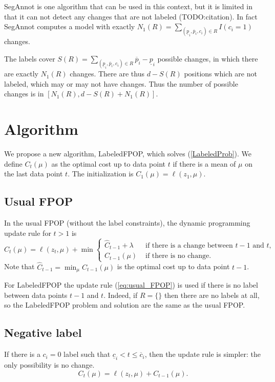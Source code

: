 \documentclass{article}
\begin{document}
SegAnnot is one algorithm that can be used in this context, but it is
limited in that it can not detect any changes that are not labeled
(TODO:citation). In fact SegAnnot computes a model with exactly
$N_1(R)=\sum_{(\underline p_i, \overline p_i, c_i)\in R} I(c_i=1)$ changes.

The labels cover
$S(R)=\sum_{(\underline p_i, \overline p_i, c_i)\in R} \overline
p_i-\underline p_i$ possible changes, in which there are exactly
$N_1(R)$ changes. There are thus $d-S(R)$ positions which are not
labeled, which may or may not have changes. Thus the number of
possible changes is in $[N_1(R), d-S(R)+N_1(R)]$.

\section{Algorithm}

We propose a new algorithm, LabeledFPOP, which solves
(\ref{LabeledProb}). We define $C_t(\mu)$ as the optimal cost up to
data point $t$ if there is a mean of $\mu$ on the last data point
$t$. The initialization is $C_1(\mu)= \ell(z_1, \mu)$. 

\subsection{Usual FPOP}
In the usual
FPOP (without the label constraints), the dynamic programming update
rule for $t>1$ is
\begin{equation}
  \label{eq:usual_FPOP}
  C_t(\mu)=\ell(z_t, \mu) + \min
  \begin{cases}
\hat C_{t-1}+\lambda &\text{ if there is a change between $t-1$ and $t$,}\\
C_{t-1}(\mu) & \text{ if there is no change.}
  \end{cases}
\end{equation}
Note that $\hat C_{t-1}=\min_\mu C_{t-1}(\mu)$ is the optimal cost up
to data point $t-1$.

For LabeledFPOP the update rule (\ref{eq:usual_FPOP}) is used if there
is no label between data points $t-1$ and $t$. Indeed, if $R=\{\}$
then there are no labels at all, so the LabeledFPOP problem and
solution are the same as the usual FPOP.

\subsection{Negative label}
If there is a $c_i=0$ label such that
$\underline c_i < t \leq \overline c_i$, then the update rule is
simpler: the only possibility is no change.
\begin{equation}
  \label{eq:negative_update}
  C_t(\mu)=\ell(z_t,\mu)+
C_{t-1}(\mu).
\end{equation}
\end{document}
